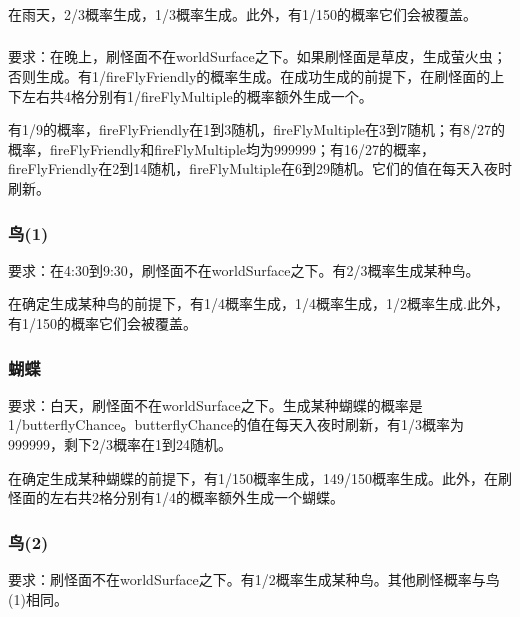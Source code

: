 \subsubsection{}
在雨天，2/3概率生成，1/3概率生成。此外，有1/150的概率它们会被覆盖。

\subsubsection{}\label{app14}
要求：在晚上，刷怪面不在worldSurface之下。如果刷怪面是草皮，生成萤火虫；否则生成。有1/fireFlyFriendly的概率生成。在成功生成的前提下，在刷怪面的上下左右共4格分别有1/fireFlyMultiple的概率额外生成一个。

有1/9的概率，fireFlyFriendly在1到3随机，fireFlyMultiple在3到7随机；有8/27的概率，fireFlyFriendly和fireFlyMultiple均为999999；有16/27的概率，fireFlyFriendly在2到14随机，fireFlyMultiple在6到29随机。它们的值在每天入夜时刷新。

\subsubsection{鸟(1)}\label{app13}
要求：在4:30到9:30，刷怪面不在worldSurface之下。有2/3概率生成某种鸟。

在确定生成某种鸟的前提下，有1/4概率生成，1/4概率生成，1/2概率生成.此外，有1/150的概率它们会被覆盖。

\subsubsection{蝴蝶}\label{app11}
要求：白天，刷怪面不在worldSurface之下。生成某种蝴蝶的概率是1/butterflyChance。butterflyChance的值在每天入夜时刷新，有1/3概率为999999，剩下2/3概率在1到24随机。

在确定生成某种蝴蝶的前提下，有1/150概率生成，149/150概率生成。此外，在刷怪面的左右共2格分别有1/4的概率额外生成一个蝴蝶。

\subsubsection{鸟(2)}
要求：刷怪面不在worldSurface之下。有1/2概率生成某种鸟。其他刷怪概率与鸟(1)相同。

